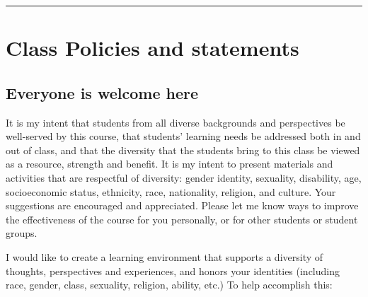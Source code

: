 \documentclass[
]{article}
\begin{document}
\begin{center}\rule{0.5\linewidth}{0.5pt}\end{center}

\hypertarget{class-policies-and-statements}{%
\section{Class Policies and
statements}\label{class-policies-and-statements}}

\hypertarget{everyone-is-welcome-here}{%
\subsection{Everyone is welcome here}\label{everyone-is-welcome-here}}

It is my intent that students from all diverse backgrounds and
perspectives be well-served by this course, that students' learning
needs be addressed both in and out of class, and that the diversity that
the students bring to this class be viewed as a resource, strength and
benefit. It is my intent to present materials and activities that are
respectful of diversity: gender identity, sexuality, disability, age,
socioeconomic status, ethnicity, race, nationality, religion, and
culture. Your suggestions are encouraged and appreciated. Please let me
know ways to improve the effectiveness of the course for you personally,
or for other students or student groups.

I would like to create a learning environment that supports a diversity
of thoughts, perspectives and experiences, and honors your identities
(including race, gender, class, sexuality, religion, ability, etc.) To
help accomplish this:
\end{document}
